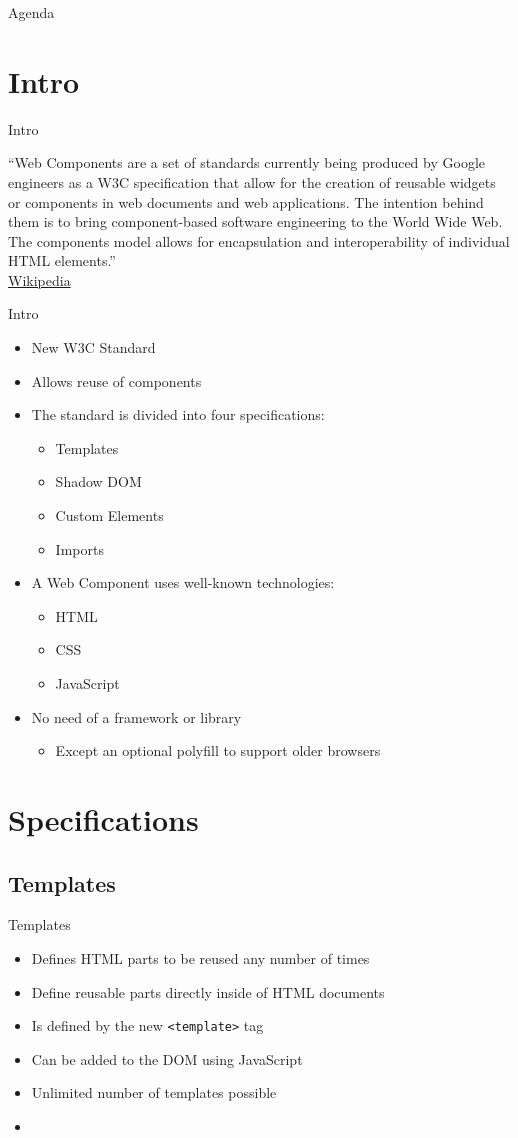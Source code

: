 \documentclass{beamer}
\newcommand{\code}[1]{\texttt{#1}}
\newcommand{\listing}[1]{
	\begin{itemize}
		\item[]
	\end{itemize}
}
\newcommand{\slideItems}[1]{
	\begin{itemize}
		#1
	\end{itemize}
}
\newcommand{\slide}[2]{
	\begin{frame}{#1}
		#2
	\end{frame}
}
\begin{document}
\slide{Agenda}{
	\setcounter{tocdepth}{1}
	\tableofcontents
}

\section{Intro}

\slide{Intro}{
	``Web Components are a set of standards currently being produced by Google engineers as a W3C specification that allow for the creation of reusable widgets or components in web documents and web applications. The intention behind them is to bring component-based software engineering to the World Wide Web. The components model allows for encapsulation and interoperability of individual HTML elements.'' \\
	\hfill\tiny{\href{https://en.wikipedia.org/wiki/Web_Components}{Wikipedia}}
}

\slide{Intro}{
	\slideItems{
		\item New W3C Standard
		\item Allows reuse of components
		\item The standard is divided into four specifications:
			\slideItems{
				\item Templates
				\item Shadow DOM
				\item Custom Elements
				\item Imports
			}
		\item A Web Component uses well-known technologies:
			\slideItems{
				\item HTML
				\item CSS
				\item JavaScript
			}
		\item No need of a framework or library
			\slideItems{
				\item Except an optional polyfill to support older browsers
			}
	}
}

\section{Specifications}

\subsection{Templates}

\slide{Templates}{
	\slideItems{
		\item Defines HTML parts to be reused any number of times
		\item Define reusable parts directly inside of HTML documents
		\item Is defined by the new \code{<template>} tag
		\item Can be added to the DOM using JavaScript
		\item Unlimited number of templates possible
	}
	\listing{template.html}
}
\end{document}
